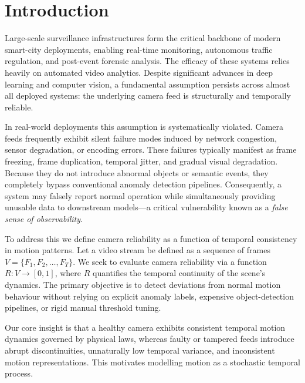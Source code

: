 \documentclass[runningheads]{llncs}
\begin{document}
\section{Introduction}

Large-scale surveillance infrastructures form the critical backbone of
modern smart-city deployments, enabling real-time monitoring, autonomous
traffic regulation, and post-event forensic analysis. The efficacy of
these systems relies heavily on automated video analytics. Despite
significant advances in deep learning and computer vision, a fundamental
assumption persists across almost all deployed systems: the underlying
camera feed is structurally and temporally reliable.

In real-world deployments this assumption is systematically violated.
Camera feeds frequently exhibit silent failure modes induced by network
congestion, sensor degradation, or encoding errors. These failures
typically manifest as frame freezing, frame duplication, temporal jitter,
and gradual visual degradation. Because they do not introduce abnormal
objects or semantic events, they completely bypass conventional anomaly
detection pipelines. Consequently, a system may falsely report normal
operation while simultaneously providing unusable data to downstream
models---a critical vulnerability known as a \textit{false sense of
observability}.

To address this we define camera reliability as a function of temporal
consistency in motion patterns. Let a video stream be defined as a
sequence of frames $V = \{F_1, F_2, \ldots, F_T\}$. We seek to evaluate
camera reliability via a function $R: V \rightarrow [0,1]$, where $R$
quantifies the temporal continuity of the scene's dynamics. The primary
objective is to detect deviations from normal motion behaviour without
relying on explicit anomaly labels, expensive object-detection pipelines,
or rigid manual threshold tuning.

Our core insight is that a healthy camera exhibits consistent temporal
motion dynamics governed by physical laws, whereas faulty or tampered
feeds introduce abrupt discontinuities, unnaturally low temporal variance,
and inconsistent motion representations. This motivates modelling motion
as a stochastic temporal process.
\end{document}
